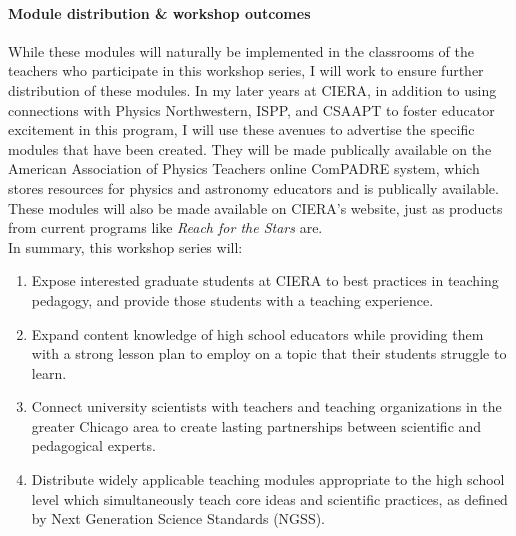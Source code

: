\documentclass[11pt, preprint]{aastex}
\begin{document}
\vspace{-0.5cm}
\paragraph{Module distribution \& workshop outcomes} 

While these modules will naturally be implemented in the classrooms of the teachers who participate in this workshop series, I will work to ensure further distribution of these modules.
In my later years at CIERA, in addition to using connections with Physics Northwestern, ISPP, and CSAAPT to foster educator excitement in this program, I will use these avenues to advertise the specific modules that have been created.
They will be made publically available on the American Association of Physics Teachers online ComPADRE system, which stores resources for physics and astronomy educators and is publically available.
These modules will also be made available on CIERA's website, just as products from current programs like \emph{Reach for the Stars} are.
 \vspace{2pt}\\
In summary, this workshop series will: 
\vspace{-14pt}
\begin{enumerate}
\item Expose interested graduate students at CIERA to best practices in teaching pedagogy, and provide those students with a teaching experience.
\vspace{-9pt}
\item Expand content knowledge of high school educators while providing them with a strong lesson plan to employ on a topic that their students struggle to learn.
\vspace{-9pt}
\item Connect university scientists with teachers and teaching organizations in the greater Chicago area to create lasting partnerships between scientific and pedagogical experts.
\vspace{-9pt}
\item Distribute widely applicable teaching modules appropriate to the high school level which simultaneously teach core ideas and scientific practices, as defined by Next Generation Science Standards (NGSS).
\vspace{-9pt}
\end{enumerate}
\end{document}
